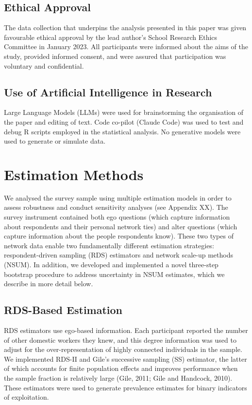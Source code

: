 \documentclass[
  12pt,
  letterpaper,
  DIV=11,
  numbers=noendperiod]{scrartcl}
\theoremstyle{plain}
\theoremstyle{definition}
\begin{document}
\subsection{Ethical Approval}\label{ethical-approval}

The data collection that underpins the analysis presented in this paper
was given favourable ethical approval by the lead author's School
Research Ethics Committee in January 2023. All participants were
informed about the aims of the study, provided informed consent, and
were assured that participation was voluntary and confidential.

\subsection{Use of Artificial Intelligence in
Research}\label{use-of-artificial-intelligence-in-research}

Large Language Models (LLMs) were used for brainstorming the
organisation of the paper and editing of text. Code co-pilot (Claude
Code) was used to test and debug R scripts employed in the statistical
analysis. No generative models were used to generate or simulate data.

\section{Estimation Methods}\label{estimation-methods}

We analysed the survey sample using multiple estimation models in order
to assess robustness and conduct sensitivity analyses (see Appendix XX).
The survey instrument contained both ego questions (which capture
information about respondents and their personal network ties) and alter
questions (which capture information about the people respondents know).
These two types of network data enable two fundamentally different
estimation strategies: respondent-driven sampling (RDS) estimators and
network scale-up methods (NSUM). In addition, we developed and
implemented a novel three-step bootstrap procedure to address
uncertainty in NSUM estimates, which we describe in more detail below.

\subsection{RDS-Based Estimation}\label{rds-based-estimation}

RDS estimators use ego-based information. Each participant reported the
number of other domestic workers they knew, and this degree information
was used to adjust for the over-representation of highly connected
individuals in the sample. We implemented RDS-II and Gile's successive
sampling (SS) estimator, the latter of which accounts for finite
population effects and improves performance when the sample fraction is
relatively large (Gile, 2011; Gile and Handcock, 2010). These estimators
were used to generate prevalence estimates for binary indicators of
exploitation.
\end{document}
